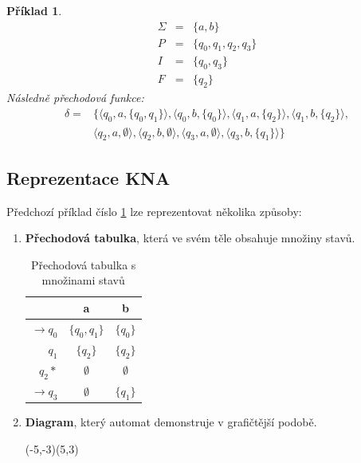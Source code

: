 \documentclass[10pt, a4paper, titlepage]{article}
\theoremstyle{note}
\newtheorem{priklad}{Příklad}
\begin{document}
\begin{priklad}\label{priklad-3}
\begin{eqnarray*}
\Sigma &=& \lbrace a, b \rbrace \\
P &=& \lbrace q_{0}, q_{1}, q_{2}, q_{3} \rbrace \\
I &=& \lbrace q_{0}, q_{3} \rbrace \\
F &=& \lbrace q_{2} \rbrace 
\end{eqnarray*}
Následně přechodová funkce:
\begin{eqnarray*}
\delta =&
\lbrace
\langle q_{0}, a, \lbrace q_{0},q_{1} \rbrace \rangle,
\langle q_{0}, b, \lbrace q_{0} \rbrace \rangle,
\langle q_{1}, a, \lbrace q_{2} \rbrace \rangle,
\langle q_{1}, b, \lbrace q_{2} \rbrace \rangle, \\
& \langle q_{2}, a, \emptyset \rangle,
\langle q_{2}, b, \emptyset \rangle,
\langle q_{3}, a, \emptyset \rangle,
\langle q_{3}, b, \lbrace q_{1} \rbrace \rangle 
\rbrace
\end{eqnarray*}
\end{priklad}

\subsection{Reprezentace KNA}
Předchozí příklad číslo \ref{priklad-3} lze reprezentovat několika způsoby:
\begin{enumerate}
\item
\textbf{Přechodová tabulka}, která ve svém těle obsahuje množiny stavů.
\begin{table}[h]
\begin{center}
\begin{tabular}{ r || c | c }                   
   & a & b \\
   \hline
   $ \rightarrow q_{0} $ & $ \lbrace q_{0},q_{1} \rbrace $ & $ \lbrace q_{0} \rbrace $ \\
   $ q_{1} $ & $ \lbrace q_{2} \rbrace $ & $ \lbrace q_{2} \rbrace $ \\
   $ q_{2} * $ & $ \emptyset $ & $ \emptyset $ \\
   $ \rightarrow q_{3} $ & $ \emptyset $ & $ \lbrace q_{1} \rbrace $ \\ 
\end{tabular}
\end{center}
\caption{Přechodová tabulka s množinami stavů}
\end{table}

\item
\textbf{Diagram}, který automat demonstruje v grafičtější podobě.

\begin{center}
\begin{VCPicture}{(-5,-3)(5,3)}
\end{VCPicture}
\end{center}


\end{enumerate}
\end{document}
